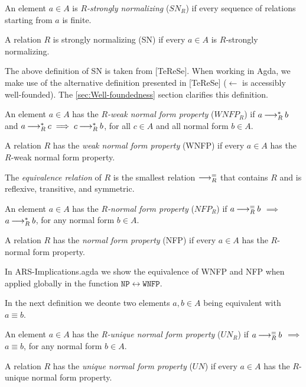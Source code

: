 \begin{definition}
    An element $a \in A$ is \emph{$R$-strongly normalizing} ($SN_R$) if every sequence of relations starting from $a$ is finite.
  
    A relation $R$ is strongly normalizing (SN) if every
    $a \in A$ is $R$-strongly normalizing.
\end{definition}

The above definition of SN is taken from [TeReSe]. 
When working in Agda, we make use of the alternative definition presented in [TeReSe] ($\leftarrow$ is accessibly well-founded). 
The \ref{sec:Well-foundedness} section clarifies this definition. 

\begin{definition}
    An element $a \in A$ has the \emph{$R$-weak normal form property} ($WNFP_{R}$) if $a \mathbin{\longrightarrow_R^*} b$ and 
    $a \mathbin{\longrightarrow_R^*} c \implies c \mathbin{\longrightarrow_R^*} b$, for all $c \in A$ and all normal form $b \in A$.
    
    A relation $R$ has the \emph{weak normal form property} (WNFP) if every $a \in A$ has the $R$-weak normal form property.    
\end{definition}

\begin{definition}
    The \emph{equivalence relation} of $R$ is the smallest relation $\mathbin{\longrightarrow_R^=}$ that contains $R$ and is reflexive, transitive, and symmetric.
\end{definition}

\begin{definition}
An element $a \in A$ has the \emph{$R$-normal form property} ($NFP_{R}$) if
$a \mathbin{\longrightarrow_R^=} b$  $\implies$
$a \mathbin{\longrightarrow_R^*} b$, for any normal form $b \in A$.

A relation $R$ has the \emph{normal form property} (NFP) if every $a \in A$ has the $R$-normal form property.
\end{definition}

In ARS-Implications.agda we show the equivalence of WNFP and NFP when applied globally in the function $\mathtt{NP \leftrightarrow WNFP}$.

In the next definition we deonte two elements $a, b \in A$ being equivalent with $a \equiv b$.
\begin{definition}
An element $a \in A$ has the \emph{{R}-unique normal form property} ($UN_{R}$) if
$a \mathbin{\longrightarrow_R^=} b$  $\implies$
$a \equiv b$, for any normal form $b \in A$.

A relation $R$ has the \emph{unique normal form property} ($UN$) if every $a \in A$ has the $R$-unique normal form property.
\end{definition}


